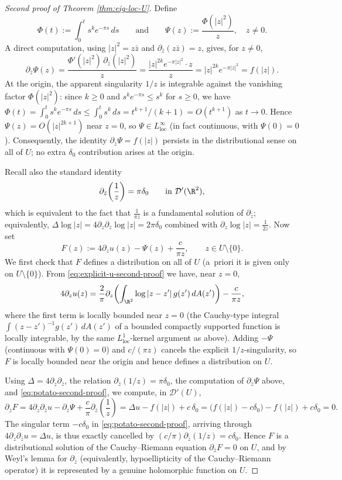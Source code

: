\begin{proof}[Second proof of Theorem \ref{thm:eig-loc-U}]
Define
\[
\Phi(t):=\int_0^t s^k e^{-\pi s}\,ds
\qquad\text{and}\qquad
\Psi(z):=\frac{\Phi(|z|^2)}{z},
\quad z\neq 0.
\]
A direct computation, using \(|z|^2=z\bar z\) and \(\partial_{\bar z}(z\bar z)=z\), gives, for
\(z\neq 0\),
\[
\partial_{\bar z}\Psi(z)
=
\frac{\Phi'(|z|^2)\,\partial_{\bar z}(|z|^2)}{z}
=
\frac{|z|^{2k}e^{-\pi|z|^2}\cdot z}{z}
=
|z|^{2k}e^{-\pi|z|^2}
=
f(|z|).
\]
At the origin, the apparent singularity \(1/z\) is integrable against the vanishing factor
\(\Phi(|z|^2)\): since \(k\ge 0\) and \(s^k e^{-\pi s}\le s^k\) for \(s\ge 0\), we have
\(\Phi(t)=\int_0^t s^k e^{-\pi s}\,ds\le \int_0^t s^k\,ds = t^{k+1}/(k+1)=O(t^{k+1})\) as
\(t\to 0\). Hence \(\Psi(z)=O(|z|^{2k+1})\) near \(z=0\), so \(\Psi\in L^\infty_{\mathrm{loc}}\)
(in fact continuous, with \(\Psi(0)=0\)). Consequently, the identity
\(\partial_{\bar z}\Psi=f(|z|)\) persists in the distributional sense on all of \(U\); no extra
\(\delta_0\) contribution arises at the origin.

Recall also the standard identity
\[
\partial_{\bar z}\!\left(\frac{1}{z}\right)=\pi\delta_0
\qquad\text{in }\mathcal D'(\R^2),
\]
which is equivalent to the fact that \(\frac{1}{\pi z}\) is a fundamental solution of
\(\partial_{\bar z}\); equivalently, \(\Delta\log|z|=4\partial_z\partial_{\bar z}\log|z|=2\pi\delta_0\)
combined with \(\partial_z\log|z|=\frac{1}{2z}\). Now set
\[
F(z):=4\partial_z u(z)-\Psi(z)+\frac{c}{\pi z},
\qquad z\in U\setminus\{0\}.
\]
We first check that \(F\) defines a distribution on all of \(U\) (a~priori it is given only on
\(U\setminus\{0\}\)). From \eqref{eq:explicit-u-second-proof} we have, near \(z=0\),
\[
4\partial_z u(z)
=
\frac{2}{\pi}\partial_z\!\left(\int_{\R^2}\log|z-z'|\,g(z')\,dA(z')\right)-\frac{c}{\pi z},
\]
where the first term is locally bounded near \(z=0\) (the Cauchy-type integral
\(\int (z-z')^{-1} g(z')\,dA(z')\) of a bounded compactly supported function is locally
integrable, by the same \(L^1_{\mathrm{loc}}\)-kernel argument as above). Adding \(-\Psi\)
(continuous with \(\Psi(0)=0\)) and \(c/(\pi z)\) cancels the explicit \(1/z\)-singularity, so
\(F\) is locally bounded near the origin and hence defines a distribution on \(U\).

Using \(\Delta=4\partial_z\partial_{\bar z}\), the relation \(\partial_{\bar z}(1/z)=\pi\delta_0\),
the computation of \(\partial_{\bar z}\Psi\) above, and \eqref{eq:potato-second-proof}, we
compute, in \(\mathcal D'(U)\),
\[
\partial_{\bar z}F
=
4\partial_z\partial_{\bar z}u-\partial_{\bar z}\Psi+\frac{c}{\pi}\partial_{\bar z}\!\left(\frac{1}{z}\right)
=
\Delta u-f(|z|)+c\,\delta_0
=
\bigl(f(|z|)-c\delta_0\bigr)-f(|z|)+c\delta_0
=0.
\]
The singular term \(-c\delta_0\) in \eqref{eq:potato-second-proof}, arriving through
\(4\partial_z\partial_{\bar z}u=\Delta u\), is thus exactly cancelled by
\((c/\pi)\partial_{\bar z}(1/z)=c\delta_0\). Hence \(F\) is a distributional solution of the
Cauchy--Riemann equation \(\partial_{\bar z}F=0\) on \(U\), and by Weyl's lemma for
\(\partial_{\bar z}\) (equivalently, hypoellipticity of the Cauchy--Riemann operator) it is
represented by a genuine holomorphic function on \(U\).


\end{proof}
